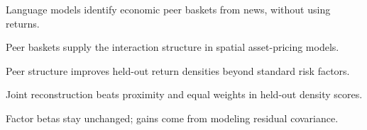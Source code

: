 \item Language models identify economic peer baskets from news, without using returns.
\item Peer baskets supply the interaction structure in spatial asset-pricing models.
\item Peer structure improves held-out return densities beyond standard risk factors.
\item Joint reconstruction beats proximity and equal weights in held-out density scores.
\item Factor betas stay unchanged; gains come from modeling residual covariance.
